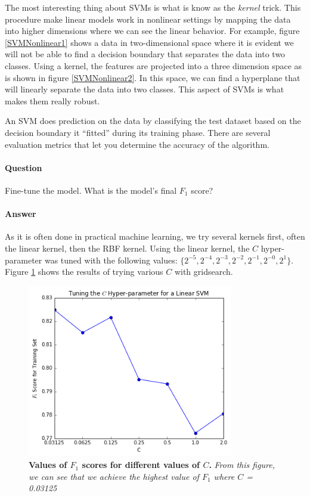 \documentclass[twoside,openright,titlepage,numbers=noenddot,headinclude,%
               footinclude=true,cleardoublepage=empty,abstractoff,BCOR=5mm,%
               paper=a4,fontsize=11pt,ngerman,american]{scrreprt}
\numberwithin{theorem}{chapter}
\numberwithin{definition}{chapter}
\numberwithin{algorithm}{chapter}
\numberwithin{figure}{chapter}
\numberwithin{table}{chapter}
\numberwithin{equation}{chapter}
\begin{document}
The most interesting thing about SVMs is what is know as the \textit{kernel} trick. This procedure make linear models work in nonlinear settings by mapping the data into higher dimensions where we can see the linear behavior. For example, figure \ref{SVMNonlinear1} shows a data in two-dimensional space where it is evident we will not be able to find a decision boundary that separates the data into two classes. Using a kernel, the features are projected into a three dimension space as is shown in figure \ref{SVMNonlinear2}. In this space, we can find a hyperplane that will linearly separate the data into two classes. This aspect of SVMs is what makes them really robust.

An SVM does prediction on the data by classifying the test dataset based on the decision boundary it ``fitted'' during its training phase. There are several evaluation metrics that let you determine the accuracy of the algorithm.


\paragraph{\textbf{Question}} Fine-tune the model. What is the model's final $F_1$ score?
\paragraph{\textbf{Answer}} As it is often done in practical machine learning, we try several kernels first, often the linear kernel, then the RBF kernel. Using the linear kernel, the $C$ hyper-parameter was tuned with the following values: $ \{2^{-5}, 2^{-4}, 2^{-3}, 2^{-2}, 2^{-1}, 2^{-0}, 2^{1} \}$. Figure \ref{tunedC} shows the results of trying various $C$ with gridsearch. 


\begin{figure}[!htbp]
  \centering
    \includegraphics[width=0.8\textwidth]{images/C_Hyperparameter}
\caption{\textbf{Values of $F_1$ scores for different values of $C$.} \textit{From this figure, we can see that we achieve the highest value of $F_1$ where $C$ = 0.03125}}
\label{tunedC}
\end{figure}
\end{document}
